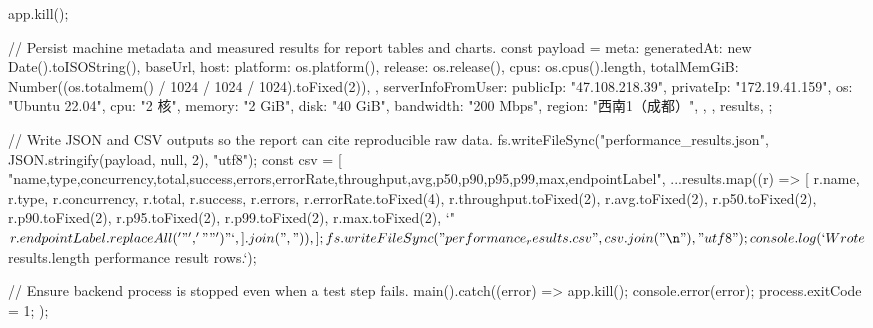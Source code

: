 \documentclass[UTF8,a4paper,12pt]{ctexart}
\begin{document}
\begin{CodeBlock}
{  app.kill();

  // Persist machine metadata and measured results for report tables and charts.
  const payload = {
    meta: {
      generatedAt: new Date().toISOString(),
      baseUrl,
      host: {
        platform: os.platform(),
        release: os.release(),
        cpus: os.cpus().length,
        totalMemGiB: Number((os.totalmem() / 1024 / 1024 / 1024).toFixed(2)),
      },
      serverInfoFromUser: {
        publicIp: "47.108.218.39",
        privateIp: "172.19.41.159",
        os: "Ubuntu 22.04",
        cpu: "2 核",
        memory: "2 GiB",
        disk: "40 GiB",
        bandwidth: "200 Mbps",
        region: "西南1（成都）",
      },
    },
    results,
  };

  // Write JSON and CSV outputs so the report can cite reproducible raw data.
  fs.writeFileSync("performance_results.json", JSON.stringify(payload, null, 2), "utf8");
  const csv = [
    "name,type,concurrency,total,success,errors,errorRate,throughput,avg,p50,p90,p95,p99,max,endpointLabel",
    ...results.map((r) => [
      r.name,
      r.type,
      r.concurrency,
      r.total,
      r.success,
      r.errors,
      r.errorRate.toFixed(4),
      r.throughput.toFixed(2),
      r.avg.toFixed(2),
      r.p50.toFixed(2),
      r.p90.toFixed(2),
      r.p95.toFixed(2),
      r.p99.toFixed(2),
      r.max.toFixed(2),
      `"${r.endpointLabel.replaceAll('"', '""')}"`,
    ].join(",")),
  ];
  fs.writeFileSync("performance_results.csv", csv.join("\n"), "utf8");
  console.log(`Wrote ${results.length} performance result rows.`);
}

// Ensure backend process is stopped even when a test step fails.
main().catch((error) => {
  app.kill();
  console.error(error);
  process.exitCode = 1;
});
\end{CodeBlock}
\end{document}
